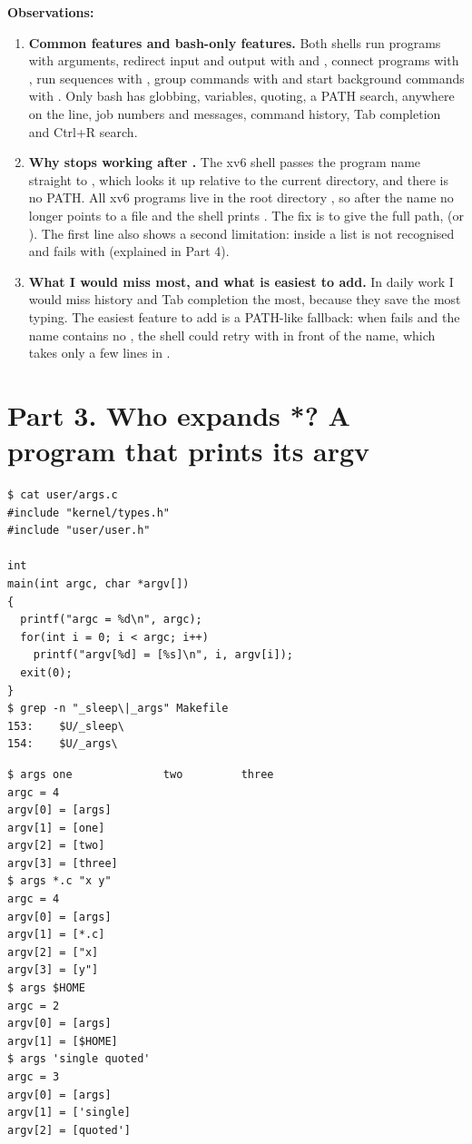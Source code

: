 \documentclass[11pt,a4paper]{article}
\begin{document}
\textbf{Observations:}
\begin{enumerate}
  \item \textbf{Common features and bash-only features.} Both shells run programs with
  arguments, redirect input and output with \code{<} and \code{>}, connect programs with
  \code{|}, run sequences with \code{;}, group commands with \code{( )} and start background
  commands with \code{\&}. Only bash has globbing, variables, quoting, a PATH search, 
  anywhere on the line, job numbers and  messages, command history, Tab completion
  and Ctrl+R search.
  \item \textbf{Why  stops working after .} The xv6 shell passes the
  program name straight to , which looks it up relative to the current directory,
  and there is no PATH. All xv6 programs live in the root directory \code{/}, so after
   the name  no longer points to a file and the shell prints
  . The fix is to give the full path,  (or ).
  The first line also shows a second limitation:  inside a \code{;} list is not
  recognised and fails with  (explained in Part 4).
  \item \textbf{What I would miss most, and what is easiest to add.} In daily work I would miss
  history and Tab completion the most, because they save the most typing. The easiest feature
  to add is a PATH-like fallback: when  fails and the name contains no \code{/}, the
  shell could retry with \code{/} in front of the name, which takes only a few lines in
  .
\end{enumerate}

\section{Part 3. Who expands *? A program that prints its argv}

\begin{lstlisting}[caption={args.c and the UPROGS line}]
$ cat user/args.c
#include "kernel/types.h"
#include "user/user.h"

int
main(int argc, char *argv[])
{
  printf("argc = %d\n", argc);
  for(int i = 0; i < argc; i++)
    printf("argv[%d] = [%s]\n", i, argv[i]);
  exit(0);
}
$ grep -n "_sleep\|_args" Makefile
153:	$U/_sleep\
154:	$U/_args\
\end{lstlisting}

\begin{lstlisting}[caption={args output in xv6}]
$ args one              two         three
argc = 4
argv[0] = [args]
argv[1] = [one]
argv[2] = [two]
argv[3] = [three]
$ args *.c "x y"
argc = 4
argv[0] = [args]
argv[1] = [*.c]
argv[2] = ["x]
argv[3] = [y"]
$ args $HOME
argc = 2
argv[0] = [args]
argv[1] = [$HOME]
$ args 'single quoted'
argc = 3
argv[0] = [args]
argv[1] = ['single]
argv[2] = [quoted']
\end{lstlisting}
\end{document}
